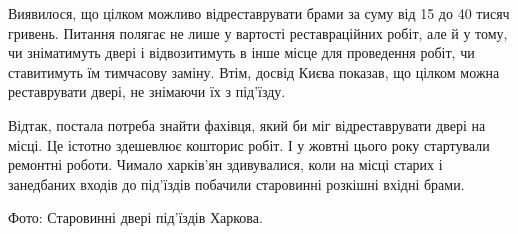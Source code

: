 Виявилося, що цілком можливо відреставрувати брами за суму від 15 до 40 тисяч
гривень. Питання полягає не лише у вартості реставраційних робіт, але й у тому,
чи зніматимуть двері і відвозитимуть в інше місце для проведення робіт, чи
ставитимуть їм тимчасову заміну. Втім, досвід Києва показав, що цілком можна
реставрувати двері, не знімаючи їх з під’їзду. 

Відтак, постала потреба знайти фахівця, який би міг відреставрувати двері на
місці. Це істотно здешевлює кошторис робіт. І у жовтні цього року стартували
ремонтні роботи. Чимало харків’ян здивувалися, коли на місці старих і
занедбаних входів до під’їздів побачили старовинні розкішні вхідні брами. 

Фото: Старовинні двері під’їздів Харкова.
